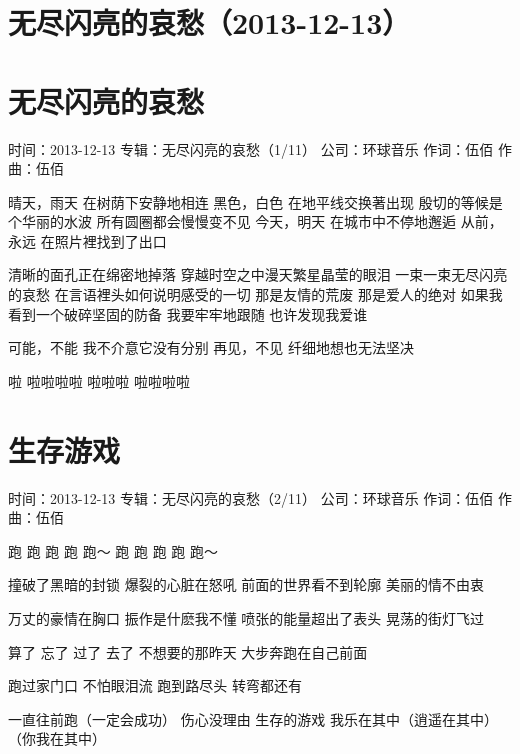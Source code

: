 \documentclass[UTF8,a4paper,oneside,twocolumn,12pt]{ctexbook}
\newcommand{\infopair}[2]{\textbullet #1：#2}
\newcommand{\zc}[1][伍佰]{\infopair{作词}{#1}}
\newcommand{\zq}[1][伍佰]{\infopair{作曲}{#1}}
\newcommand{\zj}[1]{\infopair{专辑}{#1}}
\newcommand{\sj}[1]{\infopair{时间}{#1}}
\newcommand{\gs}[1]{\infopair{公司}{#1}}
\newenvironment{info}{\begin{flushleft}\kaishu
	}
	{\end{flushleft}\normalsize\yahei\par}
\newenvironment{lyric}{
	}
{}
\begin{document}
\section*{无尽闪亮的哀愁（2013-12-13）}
\section{无尽闪亮的哀愁}
\begin{info}
	\sj{2013-12-13}
	\zj{无尽闪亮的哀愁（1/11）}
	\gs{环球音乐}
	\zc
	\zq
\end{info}
\begin{lyric}
	晴天，雨天  在树荫下安静地相连
	黑色，白色  在地平线交换著出现
	殷切的等候是个华丽的水波   所有圆圈都会慢慢变不见
	今天，明天   在城市中不停地邂逅
	从前，永远   在照片裡找到了出口

	清晰的面孔正在绵密地掉落
	穿越时空之中漫天繁星晶莹的眼泪
	一束一束无尽闪亮的哀愁
	在言语裡头如何说明感受的一切
	那是友情的荒废
	那是爱人的绝对
	如果我看到一个破碎坚固的防备
	我要牢牢地跟随
	也许发现我爱谁

	可能，不能
	我不介意它没有分别
	再见，不见
	纤细地想也无法坚决

	啦 啦啦啦啦 啦啦啦 啦啦啦啦
\end{lyric}

\section{生存游戏}
\begin{info}
	\sj{2013-12-13}
	\zj{无尽闪亮的哀愁（2/11）}
	\gs{环球音乐}
	\zc
	\zq
\end{info}
\begin{lyric}
	跑 跑 跑 跑 跑～
	跑 跑 跑 跑 跑～

	撞破了黑暗的封锁
	爆裂的心脏在怒吼
	前面的世界看不到轮廓
	美丽的情不由衷

	万丈的豪情在胸口
	振作是什麽我不懂
	喷张的能量超出了表头
	晃荡的街灯飞过

	算了 忘了 过了 去了 不想要的那昨天
	大步奔跑在自己前面

	跑过家门口 不怕眼泪流
	跑到路尽头 转弯都还有

	一直往前跑（一定会成功） 伤心没理由
	生存的游戏 我乐在其中（逍遥在其中）（你我在其中）
\end{lyric}
\end{document}
